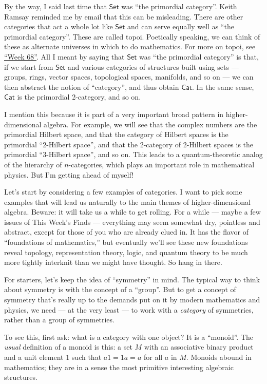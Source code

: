 \documentclass{article}
\begin{document}
By the way, I said last time that \(\mathsf{Set}\) was ``the primordial
category''. Keith Ramsay reminded me by email that this can be
misleading. There are other categories that act a whole lot like
\(\mathsf{Set}\) and can serve equally well as ``the primordial
category''. These are called topoi. Poetically speaking, we can think of
these as alternate universes in which to do mathematics. For more on
topoi, see \protect\hyperlink{week68}{``Week 68''}. All I meant by
saying that \(\mathsf{Set}\) was ``the primordial category'' is that, if
we start from \(\mathsf{Set}\) and various categories of structures
built using sets --- groups, rings, vector spaces, topological spaces,
manifolds, and so on --- we can then abstract the notion of
``category'', and thus obtain \(\mathsf{Cat}\). In the same sense,
\(\mathsf{Cat}\) is the primordial 2-category, and so on.

I mention this because it is part of a very important broad pattern in
higher-dimensional algebra. For example, we will see that the complex
numbers are the primordial Hilbert space, and that the category of
Hilbert spaces is the primordial ``2-Hilbert space'', and that the
2-category of 2-Hilbert spaces is the primordial ``3-Hilbert space'',
and so on. This leads to a quantum-theoretic analog of the hierarchy of
\(n\)-categories, which plays an important role in mathematical physics.
But I'm getting ahead of myself!

Let's start by considering a few examples of categories. I want to pick
some examples that will lead us naturally to the main themes of
higher-dimensional algebra. Beware: it will take us a while to get
rolling. For a while --- maybe a few issues of This Week's Finds ---
everything may seem somewhat dry, pointless and abstract, except for
those of you who are already clued in. It has the flavor of
``foundations of mathematics,'' but eventually we'll see these new
foundations reveal topology, representation theory, logic, and quantum
theory to be much more tightly interknit than we might have thought. So
hang in there.

For starters, let's keep the idea of ``symmetry'' in mind. The typical
way to think about symmetry is with the concept of a ``group''. But to
get a concept of symmetry that's really up to the demands put on it by
modern mathematics and physics, we need --- at the very least --- to
work with a \emph{category} of symmetries, rather than a group of
symmetries.

To see this, first ask: what is a category with one object? It is a
``monoid''. The \emph{usual} definition of a monoid is this: a set \(M\)
with an associative binary product and a unit element \(1\) such that
\(a1 = 1a = a\) for all \(a\) in \(M\). Monoids abound in mathematics;
they are in a sense the most primitive interesting algebraic structures.
\end{document}
